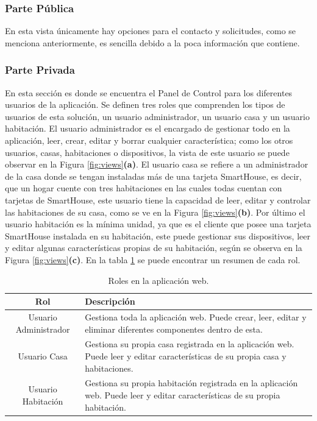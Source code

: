 \subsubsection{Parte Pública}

En esta vista únicamente hay opciones para el contacto y solicitudes, como se menciona anteriormente, es sencilla debido a la poca información que contiene.

\subsubsection{Parte Privada}

En esta sección es donde se encuentra el Panel de Control para los diferentes usuarios de la aplicación. Se definen tres roles que comprenden los tipos de usuarios de esta solución, un usuario administrador, un usuario casa y un usuario habitación. El usuario administrador es el encargado de gestionar todo en la aplicación, leer, crear, editar y borrar cualquier característica; como los otros usuarios, casas, habitaciones o dispositivos, la vista de este usuario se puede observar en la Figura \ref{fig:views}\textbf{(a)}. El usuario casa se refiere a un administrador de la casa donde se tengan instaladas más de una tarjeta SmartHouse, es decir, que un hogar cuente con tres habitaciones en las cuales todas cuentan con tarjetas de SmartHouse, este usuario tiene la capacidad de leer, editar y controlar las habitaciones de su casa, como se ve en la Figura \ref{fig:views}\textbf{(b)}. Por último el usuario habitación es la mínima unidad, ya que es el cliente que posee una tarjeta SmartHouse instalada en su habitación, este puede gestionar sus dispositivos, leer y editar algunas características propias de su habitación, según se observa en la Figura \ref{fig:views}\textbf{(c)}. En la tabla \ref{table:roles} se puede encontrar un resumen de cada rol.\\

\begin{table}
	\begin{center}
		\caption{Roles en la aplicación web.}
		\label{table:roles}
		\begin{tabular}{|c|p{5cm}|}
			\hline 
			\textbf{Rol} & \textbf{Descripción} \\ 
			\hline 
			Usuario Administrador & Gestiona toda la aplicación web. Puede crear, leer, editar y eliminar diferentes componentes dentro de esta.\\ 
			\hline 
			Usuario Casa & Gestiona su propia casa registrada en la aplicación web. Puede leer y editar características de su propia casa y habitaciones.\\ 
			\hline 
			Usuario Habitación & Gestiona su propia habitación registrada en la aplicación web. Puede leer y editar características de su propia habitación.\\ 
			\hline 
		\end{tabular} 
	\end{center}
\end{table}

